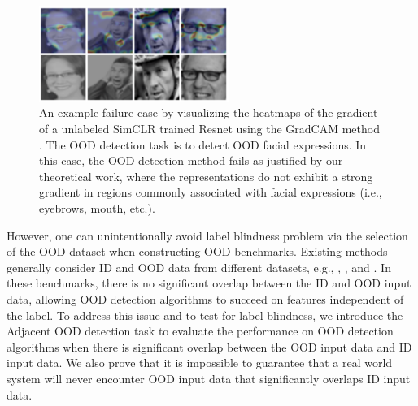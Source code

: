 \documentclass{article} %
\theoremstyle{plain}
\theoremstyle{definition}
\theoremstyle{remark}
\begin{document}
\begin{figure}
\vspace{-4mm}
    \includegraphics[width=0.55\textwidth]{gradcam_example_faces.png} %
    \caption{An example failure case by visualizing the heatmaps of the gradient of a unlabeled SimCLR trained Resnet \citep{chen2020simple} using the GradCAM method \citep{selvaraju2017grad}. The OOD detection task is to detect OOD facial expressions. In this case, the OOD detection method fails as justified by our theoretical work, where the representations do not exhibit a strong gradient in regions commonly associated with facial expressions (i.e., eyebrows, mouth, etc.).}
    \label{fig:grad}
 \vspace{-4mm}   
\end{figure}
\setlength{\belowcaptionskip}{0pt}

However, one can unintentionally avoid label blindness problem via the selection of the OOD dataset when constructing OOD benchmarks. Existing methods generally consider ID and OOD data from different datasets, e.g., \citep{fort2021exploring}, \citep{sehwag2021ssd}, and \citep{hendrycks2019using}. In these benchmarks, there is no significant overlap between the ID and OOD input data, allowing OOD detection algorithms to succeed on features independent of the label. To address this issue and to test for label blindness, we introduce the Adjacent OOD detection task to evaluate the performance on OOD detection algorithms when there is significant overlap between the OOD input data and ID input data. We also prove that it is impossible to guarantee that a real world system will never encounter OOD input data that significantly overlaps ID input data. 
\end{document}
